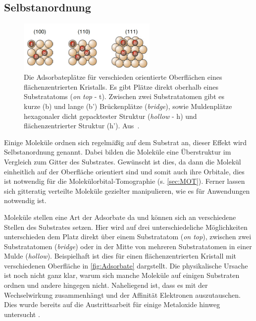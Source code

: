         \subsection{Selbstanordnung}
            \begin{figure}
                \centering
                \includegraphics[width=0.6\textwidth]{./content/pictures/Adsorbate}
                \caption{Die Adsorbateplätze für verschieden orientierte Oberflächen eines flächenzentrierten Kristalls.
                Es gibt Plätze direkt oberhalb eines Substratatoms (\textit{on top} - t).
                Zwischen zwei Substratatomen gibt es kurze (b) und lange (b') Brückenplätze (\textit{bridge}), sowie Muldenplätze hexagonaler dicht gepacktester Struktur (\textit{hollow} - h) und flächenzentrierter Struktur (h'). Aus~\cite{Fauster}.}
                \label{fig:Adsorbate}
            \end{figure}
            Einige Moleküle ordnen sich regelmäßig auf dem Substrat an, dieser Effekt wird Selbstanordnung genannt.
            Dabei bilden die Moleküle eine Überstruktur im Vergleich zum Gitter des Substrates.
            Gewünscht ist dies, da dann die Molekül einheitlich auf der Oberfläche orientiert sind und somit auch ihre Orbitale, dies ist notwendig für die Molekülorbital-Tomographie (s. \autoref{sec:MOT}).
            Ferner lassen sich gitteratig verteilte Moleküle gezielter manipulieren, wie es für Anwendungen notwendig ist.
            
            Moleküle stellen eine Art der Adsorbate da und können sich an verschiedene Stellen des Substrates setzen.
            Hier wird auf drei unterschiedeliche Möglichkeiten unterschieden dem Platz direkt über einem Substratatom (\textit{on top}), zwischen zwei Substratatomen (\textit{bridge}) oder in der Mitte von mehreren Substratatomen in einer Mulde (\textit{hollow}).
            Beispielhaft ist dies für einen flächenzentrierten Kristall mit verschiedenen Oberfläche in \autoref{fig:Adsorbate} dargstellt.
            Die physikalische Ursache ist noch nicht ganz klar, warum sich manche Moleküle auf einigen Substraten ordnen und andere hingegen nicht.
            Naheliegend ist, dass es mit der Wechselwirkung zusammenhängt und der Affinität Elektronen auszutauschen.
            Dies wurde bereits auf die Austrittsarbeit für einige Metaloxide hinweg untersucht \cite{greiner_universal_2012}.


